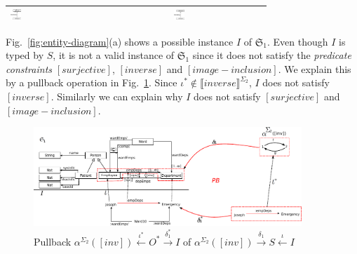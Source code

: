 \documentclass{eceasst}
\begin{document}
\begin{table}[h]
\begin{center}
\begin{tabular}{| l | c | c | c | c | }
				    \includegraphics[width=0.10\textwidth]{inheritance2-L-delta.pdf} & \includegraphics[width=0.10\textwidth]{inheritance2-R-delta.pdf} \\ 				    
    \hline    
    \end{tabular}
    \end{center}
\end{table}
\normalsize

Fig.~\ref{fig:entity-diagram}(a) shows a possible instance $I$ of $\mathfrak{S}_1$. 
Even though $I$ is typed by $S$, it is not a valid instance of $\mathfrak{S}_1$ since it does not satisfy the \textit{predicate constraints} $[surjective]$, $[inverse]$ and $[image-inclusion]$. 
We explain this by a pullback operation in Fig.~\ref{fig:entity-pb}. Since $\iota^* \notin \llbracket inverse \rrbracket^{\Sigma_2}$, $I$ does not satisfy $[inverse]$. 
Similarly we can explain why $I$ does not satisfy $[surjective]$ and $[image-inclusion]$. 


\begin{figure}[h]
\centering
 \includegraphics[width=0.9\textwidth]{entity-1-pullback.pdf}
 \caption{ Pullback $\alpha^{\Sigma_2}([inv]) \xleftarrow{\iota^*} O^* \xrightarrow{\delta_1^*} I $ of $\alpha^{\Sigma_2}([inv]) \xrightarrow{\delta_1} S \xleftarrow{\iota} I $ }
 \label{fig:entity-pb}
 \end{figure}
 
\end{document}
